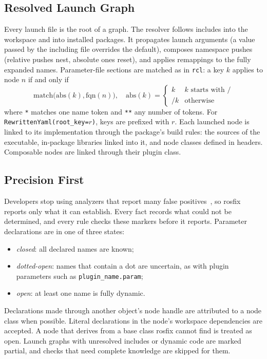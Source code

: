 \documentclass[conference]{IEEEtran}
\newcommand{\code}[1]{\texttt{#1}}
\begin{document}
\subsection{Resolved Launch Graph}
\label{sec:graph}

Every launch file is the root of a graph. The resolver follows includes into the workspace and
into installed packages. It propagates launch arguments (a value passed by the including file
overrides the default), composes namespace pushes (relative pushes nest, absolute ones reset),
and applies remappings to the fully expanded names. Parameter-file sections are matched as in
\code{rcl}: a key $k$ applies to node $n$ if and only if
\begin{equation}
\mathrm{match}\big(\mathrm{abs}(k), \mathrm{fqn}(n)\big),\quad
\mathrm{abs}(k) = \begin{cases} k & k \text{ starts with } / \\ /k & \text{otherwise}\end{cases}
\end{equation}
where \code{*} matches one name token and \code{**} any number of tokens. For
\code{RewrittenYaml(root\_key=$r$)}, keys are prefixed with $r$. Each launched node is linked to
its implementation through the package's build rules: the sources of the executable, in-package
libraries linked into it, and node classes defined in headers. Composable nodes are linked
through their plugin class.

\subsection{Precision First}
\label{sec:precision}

Developers stop using analyzers that report many false
positives~\cite{bessey2010billion,sadowski2018lessons}, so rosfix reports only what it can
establish. Every fact records what could not be determined, and every rule checks these markers
before it reports. Parameter declarations are in one of three states:
\begin{itemize}
\item \emph{closed}: all declared names are known;
\item \emph{dotted-open}: names that contain a dot are uncertain, as with plugin parameters
  such as \code{plugin\_name.param};
\item \emph{open}: at least one name is fully dynamic.
\end{itemize}
Declarations made through another object's node handle are attributed to a node class when
possible. Literal declarations in the node's workspace dependencies are accepted. A node that
derives from a base class rosfix cannot find is treated as open. Launch graphs with unresolved
includes or dynamic code are marked partial, and checks that need complete knowledge are skipped
for them.
\end{document}
